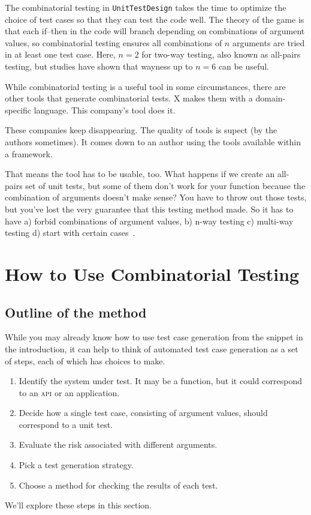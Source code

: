 \documentclass{juliacon}
\newcommand{\utd}{\texttt{UnitTestDesign}\xspace}
\begin{document}
\vskip 6pt
The combinatorial testing in \utd takes the time to optimize the choice of test cases so that they can test the code well. The theory of the game is that each if--then in the code will branch depending on combinations of argument values, so combinatorial testing ensures all combinations of $n$ arguments are tried in at least one test case. Here, $n=2$ for two-way testing, also known as all-pairs testing, but studies have shown that wayness up to $n=6$ can be useful.


\vskip 6pt
While combinatorial testing is a useful tool in some circumstances, there are other tools that generate combinatorial tests. X makes them with a domain-specific language. This company's tool does it.

\vskip 6pt
These companies keep disappearing. The quality of tools is supect (by the authors sometimes). It comes down to an author using the tools available within a framework.

\vskip 6pt
That means the tool has to be usable, too. What happens if we create an all-pairs set of unit tests, but some of them don't work for your function because the combination of arguments doesn't make sense? You have to throw out those tests, but you've lost the very guarantee that this testing method made.
So it has to have a) forbid combinations of argument values, b) n-way testing c) multi-way testing d) start with certain cases~\cite{Czerwonka2006-hm}.


\section{How to Use Combinatorial Testing}

\subsection{Outline of the method}

While you may already know how to use test case generation from the snippet in the introduction, it can help to think of automated test case generation as a set of steps, each of which has choices to make.
\begin{enumerate}
   \item Identify the system under test. It may be a function, but it could correspond to an \textsc{api} or an application.
   \item Decide how a single test case, consisting of argument values, should correspond to a unit test.
   \item Evaluate the risk associated with different arguments.
   \item Pick a test generation strategy.
   \item Choose a method for checking the results of each test.
\end{enumerate}
We'll explore these steps in this section.
\end{document}
